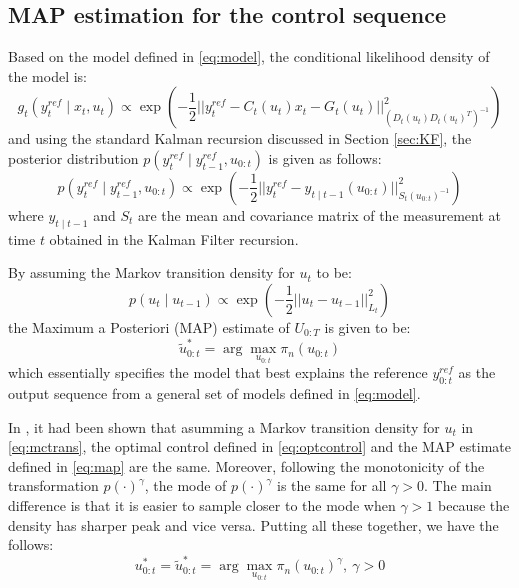 \subsection{MAP estimation for the control sequence}
Based on the model defined in \eqref{eq:model}, the conditional likelihood density of the model is:
\begin{equation}
  g_t(y^{ref}_t \mid x_t, u_t) \propto \exp\left( -\dfrac{1}{2} \vert\vert y^{ref}_t - C_t(u_t)x_t - G_t(u_t) \vert\vert^2_{(D_t(u_t)D_t(u_t)^T)^{-1}}\right)
\end{equation}
and using the standard Kalman recursion discussed in Section \ref{sec:KF}, the posterior distribution $p(y^{ref}_t \mid y^{ref}_{t-1}, u_{0:t})$ is given as follows:
\begin{equation}
  p(y^{ref}_t \mid y^{ref}_{t-1}, u_{0:t}) \propto \exp\left( -\dfrac{1}{2} \vert\vert y^{ref}_t - y_{t \mid t-1}(u_{0:t}) \vert\vert^2_{S_t(u_{0:t})^{-1}}\right)
\end{equation}
where $y_{t \mid t-1}$ and $S_t$ are the mean and covariance matrix of the measurement at time $t$ obtained in the Kalman Filter recursion.

By assuming the Markov transition density for $u_t$ to be:
\begin{equation}
  p(u_{t} \mid u_{t-1}) \propto  \exp\left( -\dfrac{1}{2} \vert\vert u_t - u_{t-1} \vert\vert^2_{L_t}\right)
\label{eq:mctrans}
\end{equation}
the Maximum a Posteriori (MAP) estimate of $U_{0:T}$ is given to be:
\begin{equation}
  \tilde{u}^*_{0:t} = \arg\max_{u_{0:t}} \pi_n(u_{0:t})
\label{eq:map}
\end{equation}
which essentially specifies the model that best explains the reference $y^{ref}_{0:t}$ as the output sequence from a general set of models defined in \eqref{eq:model}.

In \cite{NK11}, it had been shown that asumming a Markov transition density for $u_t$ in \eqref{eq:mctrans}, the optimal control defined in \eqref{eq:optcontrol} and the MAP estimate defined in \eqref{eq:map} are the same. Moreover, following the monotonicity of the transformation $p(\cdot)^\gamma$, the mode of $p(\cdot)^\gamma$ is the same for all $\gamma > 0$. The main difference is that it is easier to sample closer to the mode when $\gamma > 1$ because the density has sharper peak and vice versa. Putting all these together, we have the follows:
\begin{equation}
  u^*_{0:t} = \tilde{u}^*_{0:t} = \arg\max_{u_{0:t}} \pi_n(u_{0:t})^\gamma,~\gamma > 0
\end{equation}

